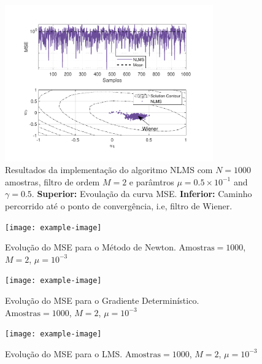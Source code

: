 \begin{enumerate}
        \begin{figure}[!htp]
            \centering
            \includegraphics[width=0.80\textwidth]{fig/hw3p4-nlms.pdf}
            \caption{Resultados da implementação do algoritmo NLMS com $N = 1000$ amostras, filtro de ordem $M = 2$ e parâmtros $\mu = 0.5 \times 10^{-1}$ and $\gamma = 0.5 $. \textbf{Superior:} Evoulação da curva MSE. \textbf{Inferior:} Caminho percorrido até o ponto de convergência, i.e, filtro de Wiener.}
            \label{fig:hw3p4-nlms}
        \end{figure}

        
        \begin{figure}[!htp]
            \centering
            \texttt{[image: example-image]}
            \caption{Evolução do MSE para o Método de Newton. $\text{Amostras} = 1000$, $M = 2$, $\mu = 10^{-3}$}
            \label{fig:newton_mse}
        \end{figure}
        
        \begin{figure}[!htp]
            \centering
            \texttt{[image: example-image]}
            \caption{Evolução do MSE para o Gradiente Determinístico. $\text{Amostras} = 1000$, $M = 2$, $\mu = 10^{-3}$}
            \label{fig:gradient_mse}
        \end{figure}
        
        \begin{figure}[!htp]
            \centering
            \texttt{[image: example-image]}
            \caption{Evolução do MSE para o LMS. $\text{Amostras}  = 1000$, $M = 2$, $\mu = 10^{-3}$}
            \label{fig:lms_mse}
        \end{figure}


\end{enumerate}
